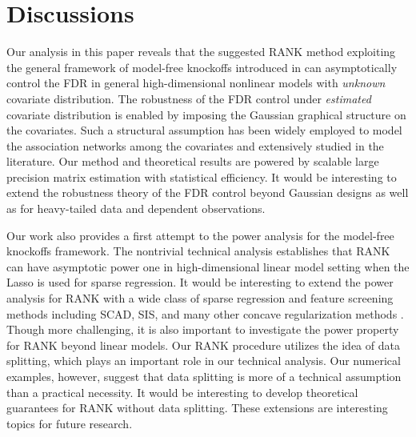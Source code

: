 \documentclass[11pt]{article}
\begin{document}


\section{Discussions} \label{sec6}

Our analysis in this paper reveals that the suggested RANK method exploiting the general framework of model-free knockoffs introduced in \cite{CandesFanJansonLv2016} can asymptotically control the FDR in general high-dimensional nonlinear models with \textit{unknown} covariate distribution. The robustness of the FDR control under \textit{estimated} covariate distribution is enabled by imposing the %
Gaussian graphical structure on the covariates. Such a structural assumption has been widely employed to model the association networks among the covariates and extensively studied in the literature. Our method and theoretical results are powered by scalable large precision matrix estimation with statistical efficiency. It would be interesting to extend the robustness theory of the FDR control beyond Gaussian designs as well as for heavy-tailed data and dependent observations.

Our work also provides a first attempt to the power analysis for the model-free knockoffs framework. The nontrivial technical analysis establishes that RANK can have asymptotic power one in high-dimensional linear model setting when the Lasso is used for sparse regression. It would be interesting to extend the power analysis for RANK with a wide class of sparse regression and feature screening methods including SCAD, SIS, and many other concave regularization methods \cite{FanLi2001, FanLv2008, FanFan2008, FanLv2013}. Though more challenging, it is also important to investigate the power property for RANK beyond linear models. Our RANK procedure utilizes the idea of data splitting, which plays an important role in our technical analysis. Our numerical examples, however, suggest that data splitting is more of a technical assumption than a practical necessity. It would be interesting to develop theoretical guarantees for  RANK without data splitting.  These extensions are interesting topics for future research.
\end{document}
